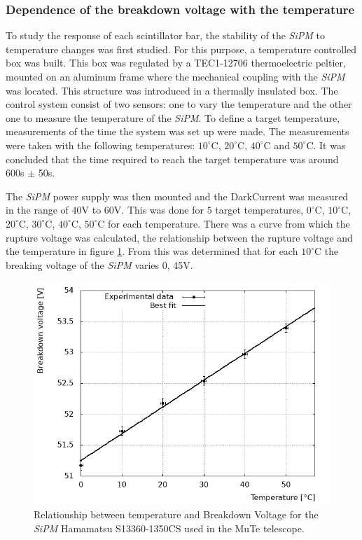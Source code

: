 \documentclass[submitting]{nst}
\begin{document}
\subsubsection{Dependence of the breakdown voltage with the temperature}%

To study the response of each scintillator bar, the stability of the \textsl{SiPM} to temperature changes was first studied. For this purpose, a temperature controlled box was built. This box was regulated by a TEC1-12706 thermoelectric peltier, mounted on an aluminum frame where the mechanical coupling with the \textsl{SiPM} was located. 
This structure was introduced in a thermally insulated box. The control system consist of two sensors: one to vary the temperature and the other one to measure the temperature of the \textsl{SiPM}. To define a target temperature, measurements of the time the system was set up were made. The measurements were taken with the following temperatures: $10^{\circ}$C, $20^{\circ}$C,  $40^{\circ}$C and $50^{\circ}$C. It was concluded that the time required to reach the target temperature was around 600s $\pm$ 50s.

The \textsl{SiPM} power supply was then mounted and the DarkCurrent \cite{Renker2006} was measured in the range of $40$V to $60$V. This was done for $5$ target temperatures, $0^{\circ}$C, $10^{\circ}$C, $20^{\circ}$C, $30^{\circ}$C, $40^{\circ}$C, $50^{\circ}$C for each temperature. There was a curve from which the rupture voltage was calculated, the relationship between the rupture voltage and the temperature in figure \ref{temperature}. From this was determined that for each $10^{\circ}$C the breaking voltage of the \textsl{SiPM} varies 0, 45V.

\begin{figure}[h!] %
    \centering
        \includegraphics[scale=0.49]{Figures/voltajeRuptura.png}
   \caption{Relationship between temperature and Breakdown Voltage for the  \textsl{SiPM} Hamamatsu S13360-1350CS used in the MuTe telescope.}\label{temperature}
\end{figure}
\end{document}
